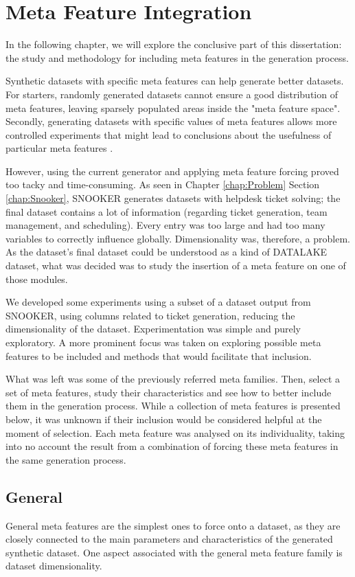 \chapter{Meta Feature Integration}
\label{chap:Integration}

In the following chapter, we will explore the conclusive part of this dissertation: the study and methodology for including meta features in the generation process.

Synthetic datasets with specific meta features can help generate better datasets. For starters, randomly generated datasets cannot ensure a good distribution of meta features, leaving sparsely populated areas inside the "meta feature space". Secondly, generating datasets with specific values of meta features allows more controlled experiments that might lead to conclusions about the usefulness of particular meta features \citep{reif2012dataset}.

However, using the current generator and applying meta feature forcing proved too tacky and time-consuming. As seen in Chapter \ref{chap:Problem} Section \ref{chap:Snooker}, SNOOKER generates datasets with helpdesk ticket solving; the final dataset contains a lot of information (regarding ticket generation, team management, and scheduling). Every entry was too large and had too many variables to correctly influence globally. Dimensionality was, therefore, a problem. As the dataset's final dataset could be understood as a kind of DATALAKE dataset, what was decided was to study the insertion of a meta feature on one of those modules.

We developed some experiments using a subset of a dataset output from SNOOKER, using columns related to ticket generation, reducing the dimensionality of the dataset. Experimentation was simple and purely exploratory. A more prominent focus was taken on exploring possible meta features to be included and methods that would facilitate that inclusion.

What was left was some of the previously referred meta families. Then, select a set of meta features, study their characteristics and see how to better include them in the generation process. While a collection of meta features is presented below, it was unknown if their inclusion would be considered helpful at the moment of selection. Each meta feature was analysed on its individuality, taking into no account the result from a combination of forcing these meta features in the same generation process.

\section{General}
General meta features are the simplest ones to force onto a dataset, as they are closely connected to the main parameters and characteristics of the generated synthetic dataset. One aspect associated with the general meta feature family is dataset dimensionality.

